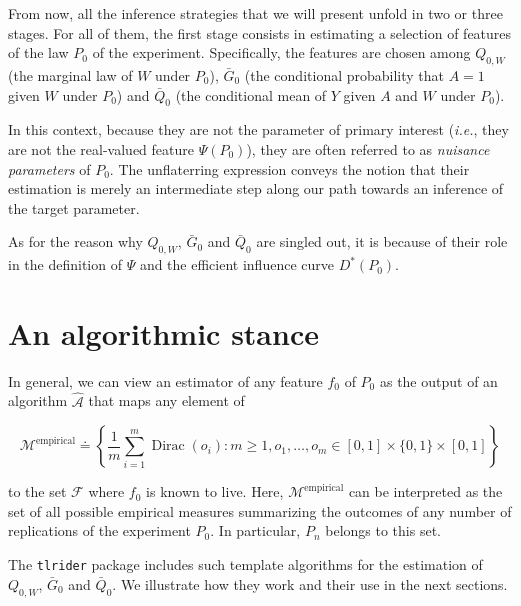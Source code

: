\documentclass[11pt,openright,twoside]{book}
\DeclareMathOperator{\Dirac}{Dirac}
\newcommand{\Algo}{\widehat{\mathcal{A}}}
\newcommand{\defq}{\doteq}
\newcommand{\calF}{\mathcal{F}}
\newcommand{\calM}{\mathcal{M}}
\newcommand{\Gbar}{\bar{G}}
\newcommand{\Qbar}{\bar{Q}}
\theoremstyle{definition}
\theoremstyle{definition}
\theoremstyle{definition}
\theoremstyle{remark}
\begin{document}
From now, all the inference strategies that we will present unfold in two or
three stages. For all of them, the first stage consists in estimating a
selection of features of the law \(P_{0}\) of the experiment. Specifically, the
features are chosen among \(Q_{0,W}\) (the marginal law of \(W\) under \(P_{0}\)),
\(\Gbar_{0}\) (the conditional probability that \(A=1\) given \(W\) under \(P_{0}\))
and \(\Qbar_{0}\) (the conditional mean of \(Y\) given \(A\) and \(W\) under \(P_{0}\)).

In this context, because they are not the parameter of primary interest
(\emph{i.e.}, they are not the real-valued feature \(\Psi(P_{0})\)), they are often
referred to as \emph{nuisance parameters} of \(P_{0}\). The unflaterring expression
conveys the notion that their estimation is merely an intermediate step along
our path towards an inference of the target parameter.

As for the reason why \(Q_{0,W}\), \(\Gbar_{0}\) and \(\Qbar_{0}\) are singled out,
it is because of their role in the definition of \(\Psi\) and the efficient
influence curve \(D^{*}(P_{0})\).


\hypertarget{an-algorithmic-stance}{%
\section{An algorithmic stance}\label{an-algorithmic-stance}}


In general, we can view an estimator of any feature \(f_0\) of \(P_{0}\) as the
output of an algorithm \(\Algo\) that maps any element of

\begin{equation*}    \calM^{\text{empirical}}     \defq    \left\{\frac{1}{m}
\sum_{i=1}^{m} \Dirac(o_{i}) : m \geq 1, o_{1}, \ldots, o_{m} \in [0,1] \times
\{0,1\} \times [0,1]\right\} \end{equation*}

to the set \(\calF\) where \(f_{0}\) is known to live. Here,
\(\calM^{\text{empirical}}\) can be interpreted as the set of all possible
empirical measures summarizing the outcomes of any number of replications of
the experiment \(P_{0}\). In particular, \(P_{n}\) belongs to this set.

The \texttt{tlrider} package includes such template algorithms for the estimation of
\(Q_{0,W}\), \(\Gbar_{0}\) and \(\Qbar_{0}\). We illustrate how they work and their
use in the next sections.
\end{document}
